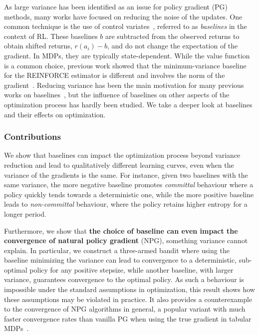 As large variance has been identified as an issue for policy gradient (PG) methods, many works have focused on reducing the noise of the updates. One common technique is the use of control variates~\citep{greensmith2004variance, hofmann2015variance}, referred to as \emph{baselines} in the context of RL. These baselines $b$ are subtracted from the observed returns to obtain shifted returns, $r(a_i) - b$, and do not change the expectation of the gradient. In MDPs, they are typically state-dependent.
While the value function is a common choice, previous work showed that the minimum-variance baseline for the REINFORCE \citep{williams1992simple} estimator is different and involves the norm of the gradient~\citep{peters2008reinforcement}.
Reducing variance has been the main motivation for many previous works on baselines~\citep[e.g.,][]{gu2016q, liu2017action, grathwohl2017backpropagation, wu2018variance, cheng2020trajectory}, but the influence of baselines on other aspects of the optimization process has hardly been studied. We take a deeper look at baselines and their effects on optimization.

\subsubsection*{Contributions}
We show that baselines can impact the optimization process 
beyond variance reduction and lead to qualitatively different learning curves, even when the variance of the gradients is the same. 
For instance, given two baselines with the same variance, the more negative baseline promotes \textit{committal} behaviour where a policy quickly tends towards a deterministic one, while the more positive baseline leads to \textit{non-committal} behaviour, where the policy retains higher entropy for a longer period.

Furthermore, we show that \textbf{the choice of baseline can even impact the convergence of natural policy gradient} (NPG), something variance cannot explain. In particular, we construct a three-armed bandit where using the baseline minimizing the variance can lead to convergence to a deterministic, sub-optimal policy for any positive stepsize, while another baseline, with larger variance, guarantees convergence to the optimal policy. As such a behaviour is impossible under the standard assumptions in optimization, this result shows how these assumptions may be violated in practice. It also provides a counterexample to the convergence of NPG algorithms in general, a popular variant with much faster convergence rates than vanilla PG when using the true gradient in tabular MDPs~\citep{agarwal2019optimality}. 


